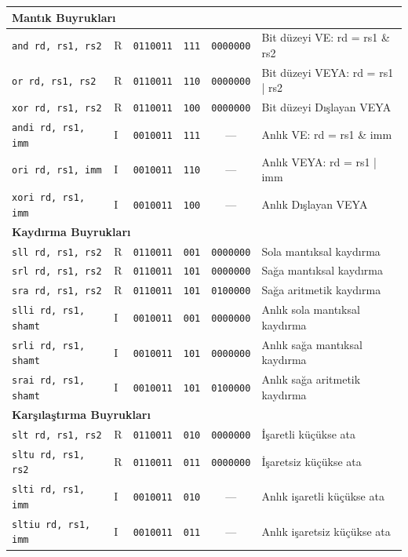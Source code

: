 {\begin{longtable}{@{}l@{\;}l@{\;}c@{\;}c@{\;}c@{\;}l@{}}
\multicolumn{6}{l}{\textbf{Mantık Buyrukları}}\index{mantık buyrukları} \\
\midrule
\texttt{and rd, rs1, rs2}   & R & \texttt{0110011} & \texttt{111} & \texttt{0000000} & Bit düzeyi VE: rd = rs1 \& rs2 \\
\texttt{or rd, rs1, rs2}    & R & \texttt{0110011} & \texttt{110} & \texttt{0000000} & Bit düzeyi VEYA: rd = rs1 | rs2 \\
\texttt{xor rd, rs1, rs2}   & R & \texttt{0110011} & \texttt{100} & \texttt{0000000} & Bit düzeyi Dışlayan VEYA \\
\texttt{andi rd, rs1, imm}  & I & \texttt{0010011} & \texttt{111} & ---          & Anlık VE: rd = rs1 \& imm \\
\texttt{ori rd, rs1, imm}   & I & \texttt{0010011} & \texttt{110} & ---          & Anlık VEYA: rd = rs1 | imm \\
\texttt{xori rd, rs1, imm}  & I & \texttt{0010011} & \texttt{100} & ---          & Anlık Dışlayan VEYA \\
\midrule

\multicolumn{6}{l}{\textbf{Kaydırma Buyrukları}}\index{kaydırma buyrukları} \\
\midrule
\texttt{sll rd, rs1, rs2}   & R & \texttt{0110011} & \texttt{001} & \texttt{0000000} & Sola mantıksal kaydırma \\
\texttt{srl rd, rs1, rs2}   & R & \texttt{0110011} & \texttt{101} & \texttt{0000000} & Sağa mantıksal kaydırma \\
\texttt{sra rd, rs1, rs2}   & R & \texttt{0110011} & \texttt{101} & \texttt{0100000} & Sağa aritmetik kaydırma \\
\texttt{slli rd, rs1, shamt} & I & \texttt{0010011} & \texttt{001} & \texttt{0000000} & Anlık sola mantıksal kaydırma \\
\texttt{srli rd, rs1, shamt} & I & \texttt{0010011} & \texttt{101} & \texttt{0000000} & Anlık sağa mantıksal kaydırma \\
\texttt{srai rd, rs1, shamt} & I & \texttt{0010011} & \texttt{101} & \texttt{0100000} & Anlık sağa aritmetik kaydırma \\
\midrule

\multicolumn{6}{l}{\textbf{Karşılaştırma Buyrukları}}\index{karşılaştırma buyrukları} \\
\midrule
\texttt{slt rd, rs1, rs2}   & R & \texttt{0110011} & \texttt{010} & \texttt{0000000} & İşaretli küçükse ata \\
\texttt{sltu rd, rs1, rs2}  & R & \texttt{0110011} & \texttt{011} & \texttt{0000000} & İşaretsiz küçükse ata \\
\texttt{slti rd, rs1, imm}  & I & \texttt{0010011} & \texttt{010} & ---          & Anlık işaretli küçükse ata \\
\texttt{sltiu rd, rs1, imm} & I & \texttt{0010011} & \texttt{011} & ---          & Anlık işaretsiz küçükse ata \\
\midrule


\end{longtable}}
